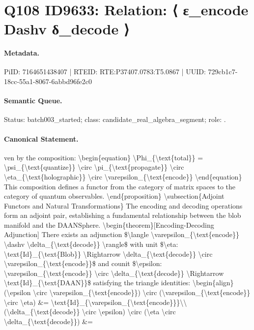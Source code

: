 \section*{Q108 ID9633: Relation: ⟨ ε\_encode Dashv δ\_decode ⟩}
\paragraph{Metadata.}
PiID: 7164651438407 | RTEID: RTE:P37407.0783:T5.0867 | UUID: 729cb1c7-18cc-55a1-8067-6abbd96fe2c0

\paragraph{Semantic Queue.}
Status: batch003\_started; class: candidate\_real\_algebra\_segment; role: .

\paragraph{Canonical Statement.}
ven by the composition: \textbackslash{}begin\{equation\} \textbackslash{}Phi\_\{\textbackslash{}text\{total\}\} = \textbackslash{}psi\_\{\textbackslash{}text\{quantize\}\} \textbackslash{}circ \textbackslash{}pi\_\{\textbackslash{}text\{propagate\}\} \textbackslash{}circ \textbackslash{}eta\_\{\textbackslash{}text\{holographic\}\} \textbackslash{}circ \textbackslash{}varepsilon\_\{\textbackslash{}text\{encode\}\} \textbackslash{}end\{equation\} This composition defines a functor from the category of matrix spaces to the category of quantum observables. \textbackslash{}end\{proposition\} \textbackslash{}subsection\{Adjoint Functors and Natural Transformations\} The encoding and decoding operations form an adjoint pair, establishing a fundamental relationship between the blob manifold and the DAANSphere. \textbackslash{}begin\{theorem\}[Encoding-Decoding Adjunction] There exists an adjunction \$\textbackslash{}langle \textbackslash{}varepsilon\_\{\textbackslash{}text\{encode\}\} \textbackslash{}dashv \textbackslash{}delta\_\{\textbackslash{}text\{decode\}\} \textbackslash{}rangle\$ with unit \$\textbackslash{}eta: \textbackslash{}text\{Id\}\_\{\textbackslash{}text\{Blob\}\} \textbackslash{}Rightarrow \textbackslash{}delta\_\{\textbackslash{}text\{decode\}\} \textbackslash{}circ \textbackslash{}varepsilon\_\{\textbackslash{}text\{encode\}\}\$ and counit \$\textbackslash{}epsilon: \textbackslash{}varepsilon\_\{\textbackslash{}text\{encode\}\} \textbackslash{}circ \textbackslash{}delta\_\{\textbackslash{}text\{decode\}\} \textbackslash{}Rightarrow \textbackslash{}text\{Id\}\_\{\textbackslash{}text\{DAAN\}\}\$ satisfying the triangle identities: \textbackslash{}begin\{align\} (\textbackslash{}epsilon \textbackslash{}circ \textbackslash{}varepsilon\_\{\textbackslash{}text\{encode\}\}) \textbackslash{}circ (\textbackslash{}varepsilon\_\{\textbackslash{}text\{encode\}\} \textbackslash{}circ \textbackslash{}eta) \&= \textbackslash{}text\{Id\}\_\{\textbackslash{}varepsilon\_\{\textbackslash{}text\{encode\}\}\}\textbackslash{}\textbackslash{} (\textbackslash{}delta\_\{\textbackslash{}text\{decode\}\} \textbackslash{}circ \textbackslash{}epsilon) \textbackslash{}circ (\textbackslash{}eta \textbackslash{}circ \textbackslash{}delta\_\{\textbackslash{}text\{decode\}\}) \&=

